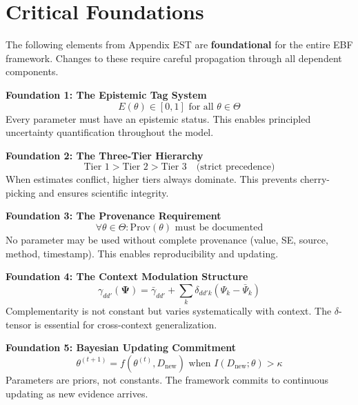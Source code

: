 \documentclass[11pt,a4paper]{article}
\theoremstyle{definition}
\begin{document}

\section{Critical Foundations}
\label{sec:bbb-critical-foundations}

\begin{tcolorbox}[colback=red!5!white, colframe=red!75!black, 
    title=\textbf{Critical Foundations for EBF}]

The following elements from Appendix EST are \textbf{foundational} for the 
entire EBF framework. Changes to these require careful propagation through 
all dependent components.

\textbf{Foundation 1: The Epistemic Tag System}
\begin{equation}
E(\theta) \in [0, 1] \text{ for all } \theta \in \Theta
\end{equation}
Every parameter must have an epistemic status. This enables principled 
uncertainty quantification throughout the model.

\textbf{Foundation 2: The Three-Tier Hierarchy}
\begin{equation}
\text{Tier 1} > \text{Tier 2} > \text{Tier 3} \quad \text{(strict precedence)}
\end{equation}
When estimates conflict, higher tiers always dominate. This prevents 
cherry-picking and ensures scientific integrity.

\textbf{Foundation 3: The Provenance Requirement}
\begin{equation}
\forall \theta \in \Theta: \text{Prov}(\theta) \text{ must be documented}
\end{equation}
No parameter may be used without complete provenance (value, SE, source, 
method, timestamp). This enables reproducibility and updating.

\textbf{Foundation 4: The Context Modulation Structure}
\begin{equation}
\gamma_{dd'}(\boldsymbol{\Psi}) = \bar{\gamma}_{dd'} + \sum_k \delta_{dd'k} (\Psi_k - \bar{\Psi}_k)
\end{equation}
Complementarity is not constant but varies systematically with context. 
The $\delta$-tensor is essential for cross-context generalization.

\textbf{Foundation 5: Bayesian Updating Commitment}
\begin{equation}
\theta^{(t+1)} = f(\theta^{(t)}, D_{\text{new}}) \text{ when } I(D_{\text{new}}; \theta) > \kappa
\end{equation}
Parameters are priors, not constants. The framework commits to continuous 
updating as new evidence arrives.

\end{tcolorbox}
\end{document}
